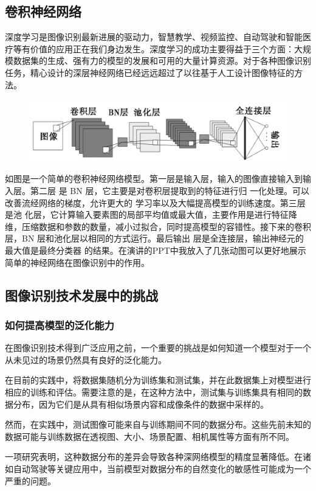 \documentclass{article}
\begin{document}
\subsection{卷积神经网络}
深度学习是图像识别最新进展的驱动力，智慧教学、视频监控、自动驾驶和智能医疗等有价值的应用正在我们身边发生。深度学习的成功主要得益于三个方面：大规模数据集的生成、强有力的模型的发展和可用的大量计算资源。对于各种图像识别任务，精心设计的深层神经网络已经远远超过了以往基于人工设计图像特征的方法。\par 
\begin{figure}[H]
	\centering
	\includegraphics[width=0.7\linewidth]{卷积神经网络}
	\caption{}
	\label{fig:}
\end{figure}
如图是一个简单的卷积神经网络模型。第一层是输入层，输入的图像直接输入到输入层。第二层 是 BN 层，它主要是对卷积层提取到的特征进行归 一化处理。可以改善流经网络的梯度，允许更大的 学习率以及大幅提高模型的训练速度。第三层是池 化层，它计算输入要素图的局部平均值或最大值，主要作用是进行特征降维，压缩数据和参数的数量，减小过拟合，同时提高模型的容错性。接下来的卷积 层，BN 层和池化层以相同的方式运行。最后输出 层是全连接层，输出神经元的最大值是最终分类器 的结果。在演讲的PPT中我放入了几张动图可以更好地展示简单的神经网络在图像识别中的作用。\par 
\subsection{图像识别技术发展中的挑战}

\subsubsection{如何提高模型的泛化能力} 
在图像识别技术得到广泛应用之前，一个重要的挑战是如何知道一个模型对于一个从未见过的场景仍然具有良好的泛化能力。\par 
在目前的实践中，将数据集随机分为训练集和测试集，并在此数据集上对模型进行相应的训练和评估。需要注意的是，在这种方法中，测试集与训练集具有相同的数据分布，因为它们是从具有相似场景内容和成像条件的数据中采样的。\par 
然而，在实践中，测试图像可能来自与训练期间不同的数据分布。这些先前未知的数据可能与训练数据在透视图、大小、场景配置、相机属性等方面有所不同。\par 
一项研究表明，这种数据分布的差异会导致各种深网络模型的精度显著降低。在诸如自动驾驶等关键应用中，当前模型对数据分布的自然变化的敏感性可能成为一个严重的问题。\par 
\end{document}
